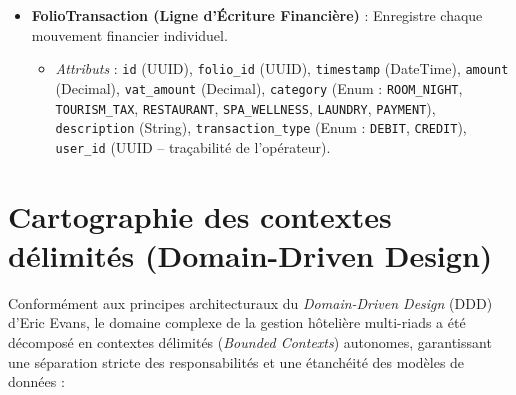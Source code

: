 \begin{itemize}
    \item \textbf{FolioTransaction (Ligne d'Écriture Financière)} : Enregistre chaque mouvement financier individuel.
    \begin{itemize}
        \item \textit{Attributs} : \texttt{id} (UUID), \texttt{folio\_id} (UUID), \texttt{timestamp} (DateTime), \texttt{amount} (Decimal), \texttt{vat\_amount} (Decimal), \texttt{category} (Enum : \texttt{ROOM\_NIGHT}, \texttt{TOURISM\_TAX}, \texttt{RESTAURANT}, \texttt{SPA\_WELLNESS}, \texttt{LAUNDRY}, \texttt{PAYMENT}), \texttt{description} (String), \texttt{transaction\_type} (Enum : \texttt{DEBIT}, \texttt{CREDIT}), \texttt{user\_id} (UUID -- traçabilité de l'opérateur).
    \end{itemize}
\end{itemize}

\section{Cartographie des contextes délimités (Domain-Driven Design)}

Conformément aux principes architecturaux du \textit{Domain-Driven Design} (DDD) d'Eric Evans, le domaine complexe de la gestion hôtelière multi-riads a été décomposé en contextes délimités (\textit{Bounded Contexts}) autonomes, garantissant une séparation stricte des responsabilités et une étanchéité des modèles de données :

